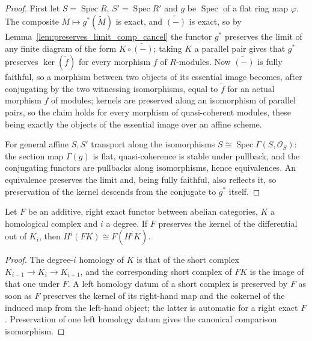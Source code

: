 \begin{proof}\leanok
  First let \(S = \operatorname{Spec} R\), \(S' = \operatorname{Spec} R'\) and \(g\) be
  \(\operatorname{Spec}\) of a flat ring map \(\varphi\). The composite \(M \mapsto g^*(\widetilde
  M)\) is exact, and \(\widetilde{(-)}\) is exact, so by
  Lemma~\ref{lem:preserves_limit_comp_cancel} the functor \(g^*\) preserves the limit of any
  finite diagram of the form \(K \circ \widetilde{(-)}\); taking \(K\) a parallel pair gives that
  \(g^*\) preserves \(\ker(\widetilde f)\) for every morphism \(f\) of \(R\)-modules. Now
  \(\widetilde{(-)}\) is fully faithful, so a morphism between two objects of its essential image
  becomes, after conjugating by the two witnessing isomorphisms, equal to \(\widetilde f\) for an
  actual morphism \(f\) of modules; kernels are preserved along an isomorphism of parallel pairs,
  so the claim holds for every morphism of quasi-coherent modules, these being exactly the objects
  of the essential image over an affine scheme.

  For general affine \(S, S'\) transport along the isomorphisms \(S \cong \operatorname{Spec}
  \Gamma(S, \mathcal{O}_S)\): the section map \(\Gamma(g)\) is flat, quasi-coherence is stable
  under pullback, and the conjugating functors are pullbacks along isomorphisms, hence
  equivalences. An equivalence preserves the limit and, being fully faithful, also reflects it, so
  preservation of the kernel descends from the conjugate to \(g^*\) itself.
\end{proof}

\begin{lemma}\leanok
  \label{lem:homology_iso_of_preserves_kernel}
  Let \(F\) be an additive, right exact functor between abelian categories, \(K\) a homological
  complex and \(i\) a degree. If \(F\) preserves the kernel of the differential out of \(K_i\),
  then \(H^i(F K) \cong F(H^i K)\).
\end{lemma}

\begin{proof}\leanok
  The degree-\(i\) homology of \(K\) is that of the short complex
  \(K_{i-1} \to K_i \to K_{i+1}\), and the corresponding short complex of \(F K\) is the image of
  that one under \(F\). A left homology datum of a short complex is preserved by \(F\) as soon as
  \(F\) preserves the kernel of its right-hand map and the cokernel of the induced map from the
  left-hand object; the latter is automatic for a right exact \(F\). Preservation of one left
  homology datum gives the canonical comparison isomorphism.
\end{proof}

